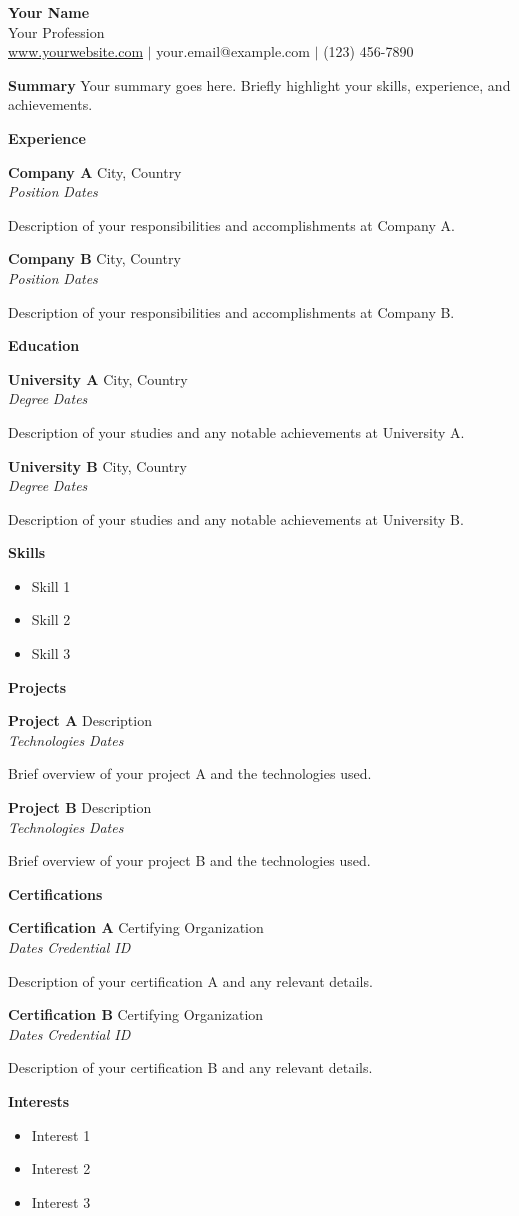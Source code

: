 \documentclass[11pt,a4paper]{article}
\newcommand{\sectionheading}[1]{\vspace{8pt}\noindent\textbf{\textcolor{myblue}{\large #1}}}
\newcommand{\entry}[4]{
  \noindent \textbf{#1} \hfill #2 \\
  \textit{#3} \hfill \textit{#4} \\
  \vspace{4pt}
}
\begin{document}
\begin{center}
  \textbf{\LARGE Your Name} \\
  \vspace{4pt}
  Your Profession \\
  \vspace{8pt}
  \url{www.yourwebsite.com} $\vert$ your.email@example.com $\vert$ (123) 456-7890
\end{center}

\sectionheading{Summary}
Your summary goes here. Briefly highlight your skills, experience, and achievements.

\sectionheading{Experience}
\entry{Company A}{City, Country}{Position}{Dates}
Description of your responsibilities and accomplishments at Company A.

\entry{Company B}{City, Country}{Position}{Dates}
Description of your responsibilities and accomplishments at Company B.

\sectionheading{Education}
\entry{University A}{City, Country}{Degree}{Dates}
Description of your studies and any notable achievements at University A.

\entry{University B}{City, Country}{Degree}{Dates}
Description of your studies and any notable achievements at University B.

\sectionheading{Skills}
\begin{itemize}
  \item Skill 1
  \item Skill 2
  \item Skill 3
\end{itemize}

\sectionheading{Projects}
\entry{Project A}{Description}{Technologies}{Dates}
Brief overview of your project A and the technologies used.

\entry{Project B}{Description}{Technologies}{Dates}
Brief overview of your project B and the technologies used.

\sectionheading{Certifications}
\entry{Certification A}{Certifying Organization}{Dates}{Credential ID}
Description of your certification A and any relevant details.

\entry{Certification B}{Certifying Organization}{Dates}{Credential ID}
Description of your certification B and any relevant details.

\sectionheading{Interests}
\begin{itemize}
  \item Interest 1
  \item Interest 2
  \item Interest 3
\end{itemize}
\end{document}

